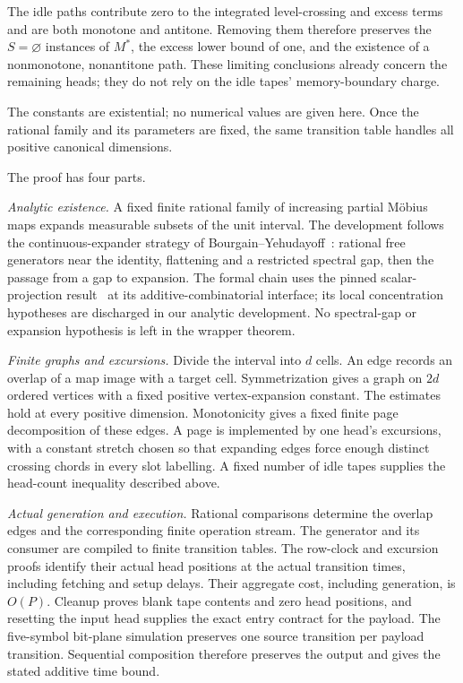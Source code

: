 The idle paths contribute zero to the integrated level-crossing and excess
terms and are both monotone and antitone. Removing them therefore preserves
the $S=\varnothing$ instances of $M^*$, the excess lower bound of one, and
the existence of a nonmonotone, nonantitone path. These limiting conclusions
already concern the remaining heads; they do not rely on the idle tapes'
memory-boundary charge.

The constants are existential; no numerical values are given here. Once the
rational family and its parameters are fixed, the same transition table
handles all positive canonical dimensions.

\begin{proofoutline}
The proof has four parts.

\emph{Analytic existence.} A fixed finite rational family of increasing
partial M\"obius maps expands measurable subsets of the unit interval.
The development follows the continuous-expander strategy of
Bourgain--Yehudayoff~\cite{BourgainYehudayoff2013}: rational free generators
near the identity, flattening and a restricted spectral gap, then the passage
from a gap to expansion. The formal chain uses the pinned scalar-projection
result~\cite{OAIProjection2026} at its additive-combinatorial interface; its
local concentration hypotheses are discharged in our analytic development.
No spectral-gap or expansion hypothesis is left in the wrapper theorem.

\emph{Finite graphs and excursions.} Divide the interval into $d$ cells.
An edge records an overlap of a map image with a target cell. Symmetrization
gives a graph on $2d$ ordered vertices with a fixed positive vertex-expansion
constant. The estimates hold at every positive dimension. Monotonicity gives
a fixed finite page decomposition of these edges. A page is implemented by
one head's excursions, with a constant stretch chosen so that expanding edges
force enough distinct crossing chords in every slot labelling. A fixed number
of idle tapes supplies the head-count inequality described above.

\emph{Actual generation and execution.} Rational comparisons determine the
overlap edges and the corresponding finite operation stream. The generator
and its consumer are compiled to finite transition tables. The row-clock and
excursion proofs identify their actual head positions at the actual transition
times, including fetching and setup delays. Their aggregate cost, including
generation, is $O(P)$. Cleanup proves blank tape contents and zero head
positions, and resetting the input head supplies the exact entry contract
for the payload. The five-symbol bit-plane simulation preserves one source
transition per payload transition. Sequential composition therefore preserves
the output and gives the stated additive time bound.


\end{proofoutline}
